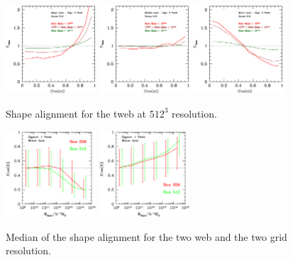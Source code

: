 \documentclass[usenatbib]{mn2e}
\begin{document}
\begin{figure}
\includegraphics[width=0.30\textwidth]{../plot2/Ax1_VT/512_AX1_T3.ps}
\includegraphics[width=0.30\textwidth]{../plot2/Ax2_VT/512_AX2_T2.ps}
\includegraphics[width=0.30\textwidth]{../plot2/Ax3_VT/512_AX3_T3.ps}
\caption{Shape alignment for the tweb at $512^3$ resolution.}
\end{figure}

\begin{figure}
\includegraphics[width=0.30\textwidth]{../plot2/Mass/VWeb.ps}
\includegraphics[width=0.30\textwidth]{../plot2/Mass/TWeb.ps}
\caption{Median of the shape alignment for the two web  and the two grid resolution.}
\end{figure}
\end{document}
